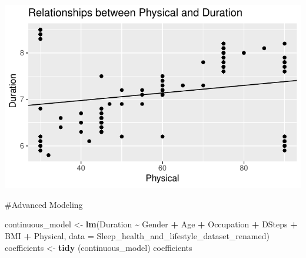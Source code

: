 \documentclass[
  11pt,
]{article}
\newenvironment{Shaded}{\begin{snugshade}}{\end{snugshade}}
\newcommand{\AttributeTok}[1]{\textcolor[rgb]{0.13,0.29,0.53}{#1}}
\newcommand{\FunctionTok}[1]{\textcolor[rgb]{0.13,0.29,0.53}{\textbf{#1}}}
\newcommand{\NormalTok}[1]{#1}
\newcommand{\OtherTok}[1]{\textcolor[rgb]{0.56,0.35,0.01}{#1}}
\newcommand{\SpecialCharTok}[1]{\textcolor[rgb]{0.81,0.36,0.00}{\textbf{#1}}}
\begin{document}
\begin{center}\includegraphics[width=0.7\linewidth]{SleepHelath_files/figure-latex/unnamed-chunk-54-1} \end{center}

\#Advanced Modeling

\begin{Shaded}
\begin{Highlighting}[]
\NormalTok{continuous\_model }\OtherTok{\textless{}{-}} \FunctionTok{lm}\NormalTok{(Duration }\SpecialCharTok{\textasciitilde{}}\NormalTok{ Gender }\SpecialCharTok{+}\NormalTok{ Age }\SpecialCharTok{+}\NormalTok{ Occupation }\SpecialCharTok{+}\NormalTok{ DSteps }\SpecialCharTok{+}\NormalTok{ BMI }\SpecialCharTok{+}\NormalTok{ Physical, }\AttributeTok{data =}\NormalTok{ Sleep\_health\_and\_lifestyle\_dataset\_renamed)}
\NormalTok{coefficients }\OtherTok{\textless{}{-}} \FunctionTok{tidy}\NormalTok{ (continuous\_model)}
\NormalTok{coefficients}
\end{Highlighting}
\end{Shaded}
\end{document}
